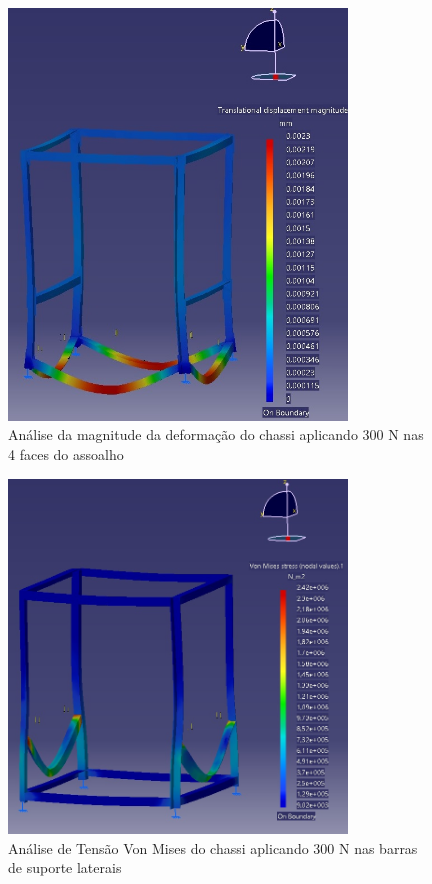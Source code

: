 \begin{figure}[H]
	\centering
	\includegraphics[width=9cm]{figuras/catia_2.jpg}
	\caption{Análise da magnitude da deformação do chassi aplicando 300 N nas 4 faces do assoalho} 
	\label{catia_2}
\end{figure}

\begin{figure}[H]
	\centering
	\includegraphics[width=9cm]{figuras/catia_3.jpg}
	\caption{Análise de Tensão Von Mises do chassi aplicando 300 N nas barras de suporte laterais} 
	\label{catia_3}
\end{figure}

